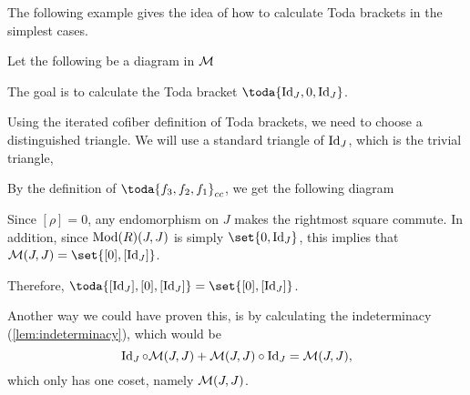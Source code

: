 The following example gives the idea of how to calculate Toda brackets in the simplest cases.

\begin{example}
	Let the following be a diagram in \( {\mathcal{M}} \)
	\begin{center}
	\end{center}
	
	The goal is to calculate the Toda bracket \( \toda{\Id_J, 0, \Id_J} \).

	Using the iterated cofiber definition of Toda brackets, we need to choose a distinguished triangle. We will use a standard triangle of \( \operatorname{Id}_J \), which is the trivial triangle,
	\begin{center}
	\end{center}

	By the definition of \( \toda{f_3, f_2, f_1}_{cc} \), we get the following diagram
	\begin{center}
	\end{center}

	Since \( [\rho] = 0 \), any endomorphism on \( J \) makes the rightmost square commute. In addition, since \( \operatorname{Mod}(R)(J, J) \) is simply \( \set{0, \Id_J} \), this implies that \( \Mc(J, J) = \set{[0], [\Id_J]} \).

	Therefore, \( \toda{[\Id_J], [0], [\Id_J]} = \set{[0], [\Id_J]} \).

	Another way we could have proven this, is by calculating the indeterminacy (\autoref{lem:indeterminacy}), which would be
	\[
		\operatorname{Id}_J \circ {\mathcal{M}}(J, J) + {\mathcal{M}}(J, J) \circ \operatorname{Id}_J = {\mathcal{M}}(J, J),
	\]
	which only has one coset, namely \( {\mathcal{M}}(J, J) \).
\end{example}

